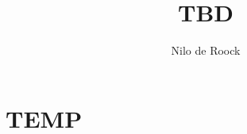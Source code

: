 \documentclass[a4paper,10pt,oneside]{book}
\title{TBD}
\author{Nilo de Roock}
\date{\Date}
\begin{document}
    \maketitle
    \tableofcontents{}
    \newpage
    \thispagestyle{empty}

%    
%    

    \chapter{TEMP}
    
\end{document}
